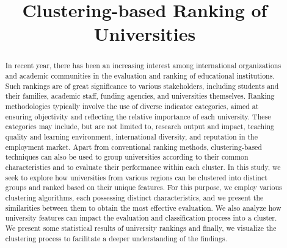 \documentclass[conference]{IEEEtran}
\begin{document}
\title{Clustering-based Ranking of Universities\\}

\author{
\and
{}
\and

}


\maketitle

\begin{abstract}
In recent year, there has been an increasing interest among international organizations and academic communities in the evaluation and ranking of educational institutions. Such rankings are of great significance to various stakeholders, including students and their families, academic staff, funding agencies, and universities themselves. Ranking methodologies typically involve the use of diverse indicator categories, aimed at ensuring objectivity and reflecting the relative importance of each university. These categories may include, but are not limited to, research output and impact, teaching quality and learning environment, international diversity, and reputation in the employment market. Apart from conventional ranking methods, clustering-based techniques can also be used to group universities according to their common characteristics and to evaluate their performance within each cluster. In this study, we seek to explore how universities from various regions can be clustered into distinct groups and ranked based on their unique features. For this purpose, we employ various clustering algorithms, each possessing distinct characteristics, and we present the similarities between them to obtain the most effective evaluation. We also analyze how university features can impact the evaluation and classification process into a cluster. We present some statistical results of university rankings and finally, we visualize the clustering process to facilitate a deeper understanding of the findings.
\end{abstract}
\end{document}

